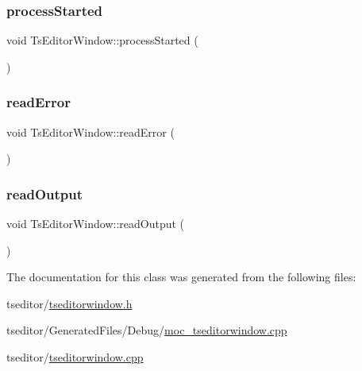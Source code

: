 \subsubsection{\texorpdfstring{processStarted}{processStarted}}
{\footnotesize\ttfamily void Ts\+Editor\+Window\+::process\+Started (\begin{DoxyParamCaption}{ }\end{DoxyParamCaption})\hspace{0.3cm}{\ttfamily [slot]}}

\mbox{\label{class_ts_editor_window_af1ee710d8865816c85c579e2f333bea6}} 
\subsubsection{\texorpdfstring{readError}{readError}}
{\footnotesize\ttfamily void Ts\+Editor\+Window\+::read\+Error (\begin{DoxyParamCaption}{ }\end{DoxyParamCaption})\hspace{0.3cm}{\ttfamily [slot]}}

\mbox{\label{class_ts_editor_window_ac74844d6fbcdba1b2529592e887e270e}} 
\subsubsection{\texorpdfstring{readOutput}{readOutput}}
{\footnotesize\ttfamily void Ts\+Editor\+Window\+::read\+Output (\begin{DoxyParamCaption}{ }\end{DoxyParamCaption})\hspace{0.3cm}{\ttfamily [slot]}}



The documentation for this class was generated from the following files\+:\begin{DoxyCompactItemize}
\item 
tseditor/\mbox{\hyperlink{tseditorwindow_8h}{tseditorwindow.\+h}}\item 
tseditor/\+Generated\+Files/\+Debug/\mbox{\hyperlink{_debug_2moc__tseditorwindow_8cpp}{moc\+\_\+tseditorwindow.\+cpp}}\item 
tseditor/\mbox{\hyperlink{tseditorwindow_8cpp}{tseditorwindow.\+cpp}}\end{DoxyCompactItemize}

